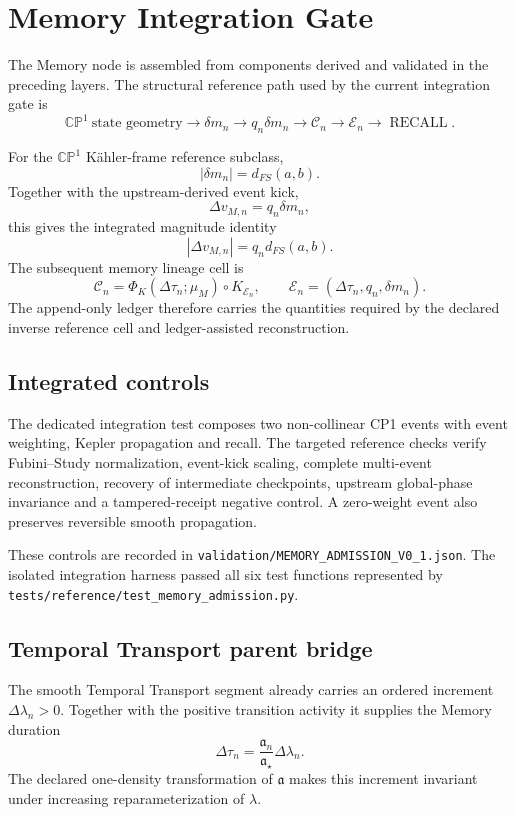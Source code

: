 \documentclass[11pt]{book}
\begin{document}
\chapter{Memory Integration Gate}

The Memory node is assembled from components derived and validated in the preceding layers. The structural reference path used by the current integration gate is
\[
\boxed{
\mathbb{CP}^1\ \text{state geometry}
\longrightarrow
\delta m_n
\longrightarrow
q_n\delta m_n
\longrightarrow
\mathcal C_n
\longrightarrow
\mathcal E_n
\longrightarrow
\operatorname{RECALL}.
}
\]

For the \(\mathbb{CP}^1\) K\"ahler-frame reference subclass,
\[
|\delta m_n|=d_{FS}(a,b).
\]
Together with the upstream-derived event kick,
\[
\Delta v_{M,n}=q_n\delta m_n,
\]
this gives the integrated magnitude identity
\[
\boxed{
|\Delta v_{M,n}|=q_n d_{FS}(a,b).
}
\]
The subsequent memory lineage cell is
\[
\mathcal C_n
=\Phi_K(\Delta\tau_n;\mu_M)\circ K_{\mathcal E_n},
\qquad
\mathcal E_n=(\Delta\tau_n,q_n,\delta m_n).
\]
The append-only ledger therefore carries the quantities required by the declared inverse reference cell and ledger-assisted reconstruction.

\section{Integrated controls}

The dedicated integration test composes two non-collinear CP1 events with event weighting, Kepler propagation and recall. The targeted reference checks verify Fubini--Study normalization, event-kick scaling, complete multi-event reconstruction, recovery of intermediate checkpoints, upstream global-phase invariance and a tampered-receipt negative control. A zero-weight event also preserves reversible smooth propagation.

These controls are recorded in
\texttt{validation/MEMORY\_ADMISSION\_V0\_1.json}.
The isolated integration harness passed all six test functions represented by
\texttt{tests/reference/test\_memory\_admission.py}.

\section{Temporal Transport parent bridge}

The smooth Temporal Transport segment already carries an ordered increment \(\Delta\lambda_n>0\). Together with the positive transition activity it supplies the Memory duration
\[
\boxed{
\Delta\tau_n
=\frac{\mathfrak a_n}{\mathfrak a_\star}\Delta\lambda_n.
}
\]
The declared one-density transformation of \(\mathfrak a\) makes this increment invariant under increasing reparameterization of \(\lambda\).
\end{document}
